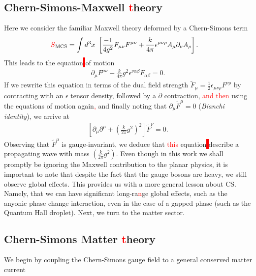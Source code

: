     \subsection{Chern-Simons-Maxwell \textcolor{red}{t}heory}
    Here we consider the familiar Maxwell theory deformed by a Chern-Simons term
    \begin{align}
        \textcolor{red}{S}_{\text{MCS}} &= \int d^3x \ \left[ \frac{-1}{4 g^2} F_{\mu \nu} F^{\mu \nu} + \frac{k}{4 \pi} \epsilon^{\mu \nu \rho} A_{\mu} \partial_{\nu} A_{\rho} \right].
    \end{align}
    This leads to the equation\colorbox{red}{ } of motion
    \begin{align}
        \partial_{\mu} F^{\mu \nu} + \frac{k}{4\pi} g^2 \epsilon^{\nu \alpha \beta}F_{\alpha \beta} =0.
    \end{align}
    If we rewrite this equation in terms of the dual field strength $\tilde{F}_{\mu} = \frac{1}{2} \epsilon_{\mu\nu\rho} F^{\nu\rho}$ by contracting with an $\epsilon$ tensor density, followed by a $\partial$ contraction, \textcolor{red}{and then} using the equations of motion again\textcolor{red}{,} and finally noting that $\partial_{\mu} \tilde{F}^{\mu} =0$ (\textit{Bianchi identity}), we arrive at 
    \begin{align}
        \left[\partial_{\mu} \partial^{\mu} + \left(\frac{k}{2 \pi} g^2 \right)^2 \right] \tilde{F}^{\nu}=0.
    \end{align}
    Observing that $\tilde{F}^{\mu}$ is gauge-invariant, we deduce that \textcolor{red}{this} equation\colorbox{red}{ } describe a propagating wave with mass $\left(\frac{k}{2 \pi} g^2 \right)$.
    Even though in this work we shall promptly be ignoring the Maxwell contribution to the planar physics, it is important to note that despite the fact that the gauge bosons are heavy, we still observe global effects. This provides us with a more general lesson about CS. Namely, that we can have significant long-ra\textcolor{red}{n}ge global effects, such as the anyonic phase change interaction, even in the case of a gapped phase (such as the Quantum Hall droplet).
    Next, we turn to the matter sector.
    \subsection{Chern-Simons Matter \textcolor{red}{t}heory}
    
    We begin by coupling the Chern-Simons gauge field to a general conserved matter current


